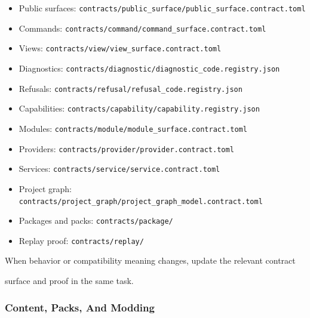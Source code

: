 \documentclass[9pt,a4paper,openany]{book}
\begin{document}
\begin{itemize}
\item Public surfaces: \texttt{contracts/\allowbreak{}public\_\allowbreak{}surface/\allowbreak{}public\_\allowbreak{}surface.\allowbreak{}contract.\allowbreak{}toml}
\item Commands: \texttt{contracts/\allowbreak{}command/\allowbreak{}command\_\allowbreak{}surface.\allowbreak{}contract.\allowbreak{}toml}
\item Views: \texttt{contracts/\allowbreak{}view/\allowbreak{}view\_\allowbreak{}surface.\allowbreak{}contract.\allowbreak{}toml}
\item Diagnostics: \texttt{contracts/\allowbreak{}diagnostic/\allowbreak{}diagnostic\_\allowbreak{}code.\allowbreak{}registry.\allowbreak{}json}
\item Refusals: \texttt{contracts/\allowbreak{}refusal/\allowbreak{}refusal\_\allowbreak{}code.\allowbreak{}registry.\allowbreak{}json}
\item Capabilities: \texttt{contracts/\allowbreak{}capability/\allowbreak{}capability.\allowbreak{}registry.\allowbreak{}json}
\item Modules: \texttt{contracts/\allowbreak{}module/\allowbreak{}module\_\allowbreak{}surface.\allowbreak{}contract.\allowbreak{}toml}
\item Providers: \texttt{contracts/\allowbreak{}provider/\allowbreak{}provider.\allowbreak{}contract.\allowbreak{}toml}
\item Services: \texttt{contracts/\allowbreak{}service/\allowbreak{}service.\allowbreak{}contract.\allowbreak{}toml}
\item Project graph: \texttt{contracts/\allowbreak{}project\_\allowbreak{}graph/\allowbreak{}project\_\allowbreak{}graph\_\allowbreak{}model.\allowbreak{}contract.\allowbreak{}toml}
\item Packages and packs: \texttt{contracts/\allowbreak{}package/\allowbreak{}}
\item Replay proof: \texttt{contracts/\allowbreak{}replay/\allowbreak{}}
\end{itemize}

When behavior or compatibility meaning changes, update the relevant contract

surface and proof in the same task.\allowbreak{}


\subsubsection{Content, Packs, And Modding}
\end{document}

